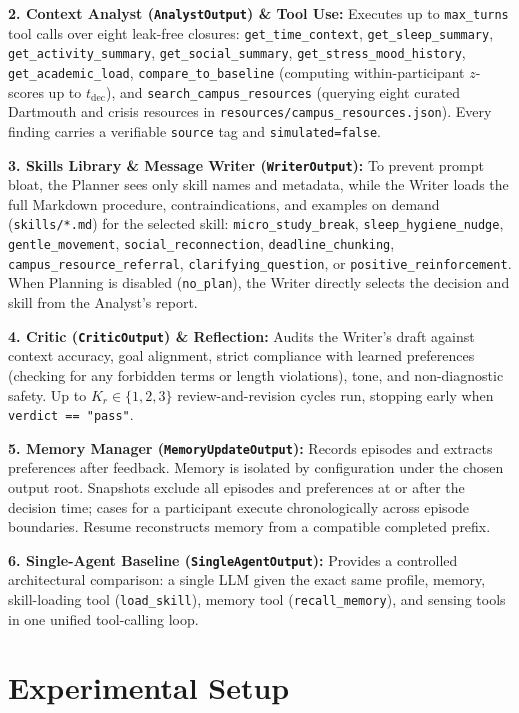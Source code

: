 \documentclass{article}
\begin{document}
\textbf{2. Context Analyst (\texttt{AnalystOutput}) \& Tool Use:} Executes up to \texttt{max\_turns} tool calls over eight leak-free closures: \texttt{get\_time\_context}, \texttt{get\_sleep\_summary}, \texttt{get\_activity\_summary}, \texttt{get\_social\_summary}, \texttt{get\_stress\_mood\_history}, \texttt{get\_academic\_load}, \texttt{compare\_to\_baseline} (computing within-participant $z$-scores up to $t_{\text{dec}}$), and \texttt{search\_campus\_resources} (querying eight curated Dartmouth and crisis resources in \texttt{resources/campus\_resources.json}). Every finding carries a verifiable \texttt{source} tag and \texttt{simulated=false}.

\textbf{3. Skills Library \& Message Writer (\texttt{WriterOutput}):} To prevent prompt bloat, the Planner sees only skill names and metadata, while the Writer loads the full Markdown procedure, contraindications, and examples on demand (\texttt{skills/*.md}) for the selected skill: \texttt{micro\_study\_break}, \texttt{sleep\_hygiene\_nudge}, \texttt{gentle\_movement}, \texttt{social\_reconnection}, \texttt{deadline\_chunking}, \texttt{campus\_resource\_referral}, \texttt{clarifying\_question}, or \texttt{positive\_reinforcement}. When Planning is disabled (\texttt{no\_plan}), the Writer directly selects the decision and skill from the Analyst's report.

\textbf{4. Critic (\texttt{CriticOutput}) \& Reflection:} Audits the Writer's draft against context accuracy, goal alignment, strict compliance with learned preferences (checking for any forbidden terms or length violations), tone, and non-diagnostic safety. Up to $K_r \in \{1, 2, 3\}$ review-and-revision cycles run, stopping early when \texttt{verdict == "pass"}.

\textbf{5. Memory Manager (\texttt{MemoryUpdateOutput}):} Records episodes and extracts preferences after feedback. Memory is isolated by configuration under the chosen output root. Snapshots exclude all episodes and preferences at or after the decision time; cases for a participant execute chronologically across episode boundaries. Resume reconstructs memory from a compatible completed prefix.

\textbf{6. Single-Agent Baseline (\texttt{SingleAgentOutput}):} Provides a controlled architectural comparison: a single LLM given the exact same profile, memory, skill-loading tool (\texttt{load\_skill}), memory tool (\texttt{recall\_memory}), and sensing tools in one unified tool-calling loop.

\section{Experimental Setup}
\label{sec:setup}
\end{document}
